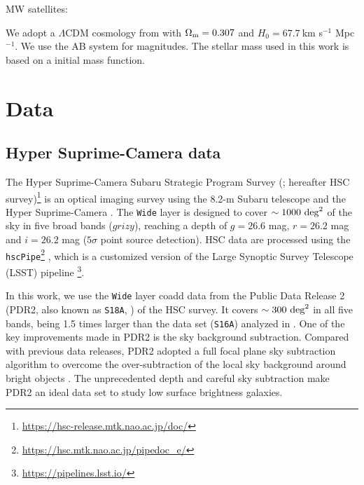 \documentclass[twocolumn,astrosymb,twocolappendix]{aastex631}
\newcommand{\code}[1]{\texttt{#1}}
\begin{document}
\begin{CJK*}{UTF8}{gbsn}
MW satellites: \citep{Nashimoto2022}


We adopt a $\Lambda$CDM cosmology from \citet{Planck15} with $\Omega_{\rm m}= 0.307$ and $H_0 = 67.7\ $km s$^{-1}$ Mpc$^{-1}$. We use the AB system \citep{Oke1983} for magnitudes. The stellar mass used in this work is based on a \citet{Chabrier2003} initial mass function.

\section{Data} \label{sec:data}
\subsection{Hyper Suprime-Camera data}
The Hyper Suprime-Camera Subaru Strategic Program Survey (\citealt{Aihara2018}; hereafter HSC survey)\footnote{\url{https://hsc-release.mtk.nao.ac.jp/doc/}} is an optical imaging survey using the 8.2-m Subaru telescope and the Hyper Suprime-Camera \citep{Miyazaki2012, Miyazaki2018}. The \texttt{Wide} layer is designed to cover $\sim 1000\ \rm{deg}^{2}$ of the sky in five broad bands ($grizy$), reaching a depth of $g=26.6$ mag, $r=26.2$ mag and $i=26.2$ mag ($5\sigma$ point source detection). HSC data are processed using the \code{hscPipe}\footnote{\url{https://hsc.mtk.nao.ac.jp/pipedoc_e/}} \citep{Bosch2018}, which is a customized version of the Large Synoptic Survey Telescope (LSST) pipeline \citep{LSST-pipeline}\footnote{\url{https://pipelines.lsst.io/}}. 

In this work, we use the \code{Wide} layer coadd data from the Public Data Release 2 (PDR2, also known as \code{S18A}, \citealt{Aihara2018}) of the HSC survey. It covers $\sim 300\ \rm{deg}^2$ in all five bands, being 1.5 times larger than the data set (\code{S16A}) analyzed in \citet{Greco2018}. One of the key improvements made in PDR2 is the sky background subtraction. Compared with previous data releases, PDR2 adopted a full focal plane sky subtraction algorithm to overcome the over-subtraction of the local sky background around bright objects \citep{Aihara2018,Li2021}. The unprecedented depth and careful sky subtraction make PDR2 an ideal data set to study low surface brightness galaxies. 



\end{CJK*}
\end{document}

